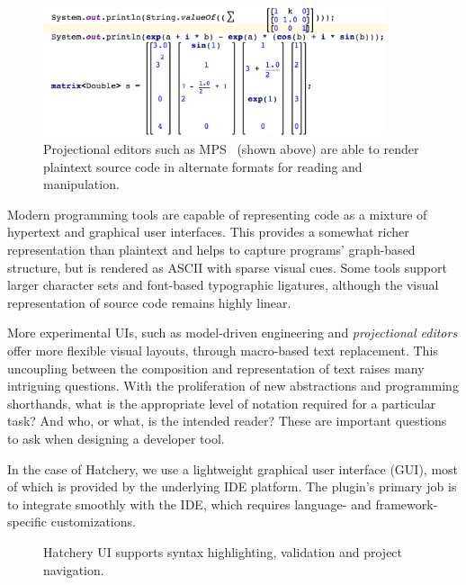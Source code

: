 \documentclass[12pt,initial,twoside,maitrise]{dms}
\numberwithin{equation}{section}
\numberwithin{table}{chapter}
\numberwithin{figure}{chapter}
\begin{document}
\begin{figure}
    \centering
    \includegraphics[width=0.90\textwidth]{mps_screenshot.png}
    \caption{Projectional editors such as MPS~\citep{voelter2010language} (shown above)  are able to render plaintext source code in alternate formats for reading and manipulation.}
    \label{fig:mps_screenshot}
\end{figure}

Modern programming tools are capable of representing code as a mixture of hypertext and graphical user interfaces. This provides a somewhat richer representation than plaintext and helps to capture programs' graph-based structure, but is rendered as ASCII with sparse visual cues. Some tools support larger character sets and font-based typographic ligatures, although the visual representation of source code remains highly linear.

More experimental UIs, such as model-driven engineering and \textit{projectional editors} offer more flexible visual layouts, through macro-based text replacement. This uncoupling between the composition and representation of text raises many intriguing questions. With the proliferation of new abstractions and programming shorthands, what is the appropriate level of notation required for a particular task? And who, or what, is the intended reader? These are important questions to ask when designing a developer tool.

In the case of Hatchery, we use a lightweight graphical user interface (GUI), most of which is provided by the underlying IDE platform. The plugin's primary job is to integrate smoothly with the IDE, which requires language- and framework-specific customizations.

\begin{figure}[b]
    \centering
    \caption{Hatchery UI supports syntax highlighting, validation and project navigation.}
    \label{fig:hatchery_gui}
\end{figure}
\end{document}

